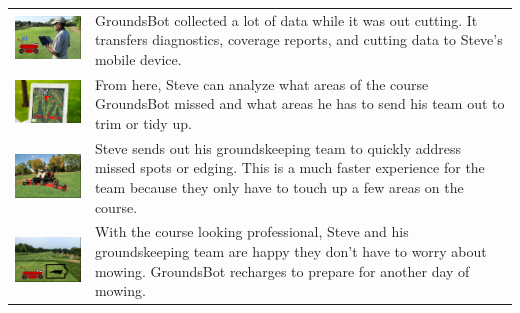 \documentclass[12pt]{extarticle}
\begin{document}
\begin{table}[H]
   \def\arraystretch{4}
   \setlength\tabcolsep{8pt}


\begin{tabularx}{\textwidth}{cX}
\includegraphics[width=6cm, valign=t]{usecase2_2.png} &
GroundsBot collected a lot of data while it was out cutting. It transfers diagnostics, coverage reports, and cutting data to Steve’s mobile device.
\\
\includegraphics[width=6cm, valign=t]{usecase2_3.png} &
From here, Steve can analyze what areas of the course GroundsBot missed and what areas he has to send his team out to trim or tidy up.
\\
\includegraphics[width=6cm, valign=t]{usecase2_4.png} &
Steve sends out his groundskeeping team to quickly address missed spots or edging. This is a much faster experience for the team because they only have to touch up a few areas on the course.
\\
\includegraphics[width=6cm, valign=t]{usecase2_5.png} &
With the course looking professional, Steve and his groundskeeping team are happy they don’t have to worry about mowing. GroundsBot recharges to prepare for another day of mowing.
\\

\end{tabularx}
\end{table}
\end{document}
